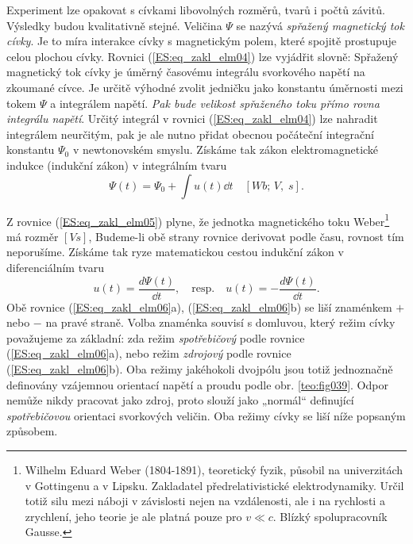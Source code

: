       Experiment lze opakovat s cívkami libovolných rozměrů, tvarů i počtů závitů. Výsledky budou
      kvalitativně stejné. Veličina \(\Psi\) se nazývá \emph{spřažený magnetický tok cívky}. Je to 
      míra interakce cívky s magnetickým polem, které spojitě prostupuje celou plochou cívky. 
      Rovnici (\ref{ES:eq_zakl_elm04}) lze vyjádřit slovně: Spřažený magnetický tok cívky je úměrný 
      časovému integrálu svorkového napětí na zkoumané cívce. Je určitě výhodné zvolit jedničku 
      jako konstantu úměrnosti mezi tokem \(\Psi\) a integrálem napětí. \emph{Pak bude velikost 
      spřaženého toku přímo rovna integrálu napětí}. Určitý integrál v rovnici 
      (\ref{ES:eq_zakl_elm04}) lze nahradit integrálem neurčitým, pak je ale nutno přidat obecnou 
      počáteční integrační konstantu \(\Psi_0\)
      v newtonovském smyslu. Získáme tak zákon elektromagnetické indukce (indukční zákon) v
      integrálním tvaru
      \begin{equation}\label{ES:eq_zakl_elm05}
       \Psi(t) = \Psi_0 + \int u(t)\dd{t} \quad [Wb;\, V,\; s].
      \end{equation}   
    
    Z rovnice (\ref{ES:eq_zakl_elm05}) plyne, že jednotka magnetického toku Weber\footnote{Wilhelm
    Eduard Weber (1804-1891), teoretický fyzik, působil na univerzitách v Gottingenu a v Lipsku.
    Zakladatel předrelativistické elektrodynamiky. Určil totiž silu mezi náboji v závislosti nejen
    na vzdálenosti, ale i na rychlosti a zrychlení, jeho teorie je ale platná pouze pro \(v \ll c\).
    Blízký spolupracovník Gausse.} má rozměr \([Vs]\), Budeme-li obě strany rovnice derivovat podle
    času, rovnost tím neporušíme. Získáme tak ryze matematickou cestou indukční zákon v
    diferenciálním tvaru
    \begin{equation}\label{ES:eq_zakl_elm06}
     u(t) = \frac{d\Psi(t)}{\dd{t}}, \quad \text{resp.} \quad  u(t) = -\frac{d\Psi(t)}{\dd{t}}.
    \end{equation}   
    Obě rovnice (\ref{ES:eq_zakl_elm06}a), (\ref{ES:eq_zakl_elm06}b) se liší znaménkem \(+\) nebo
    \(-\) na pravé straně. Volba znaménka souvisí s domluvou, který režim cívky považujeme za
    základní: zda režim \emph{spotřebičový} podle rovnice (\ref{ES:eq_zakl_elm06}a), nebo režim
    \emph{zdrojový} podle rovnice (\ref{ES:eq_zakl_elm06}b). Oba režimy jakéhokoli dvojpólu jsou
    totiž jednoznačně definovány vzájemnou orientací napětí a proudu podle obr.
    \ref{teo:fig039}. Odpor nemůže nikdy pracovat jako zdroj, proto slouží jako
    „normál“ definující \emph{spotřebičovou} orientaci svorkových veličin. Oba režimy cívky se liší
    níže popsaným způsobem.

